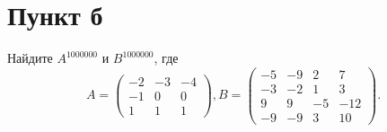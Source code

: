 \documentclass[12pt]{article}
\begin{document}
    \section*{Пункт б}
    Найдите $A^{1000000}$ и $B^{1000000}$, где
    \[
        A =
        \begin{pmatrix}
            -2 & -3 & -4 \\
            -1 & 0  & 0  \\
            1  & 1  & 1
        \end{pmatrix},
        B =
        \begin{pmatrix}
            -5 & -9 & 2  & 7   \\
            -3 & -2 & 1  & 3   \\
            9  & 9  & -5 & -12 \\
            -9 & -9 & 3  & 10
        \end{pmatrix}.
    \]
\end{document}

